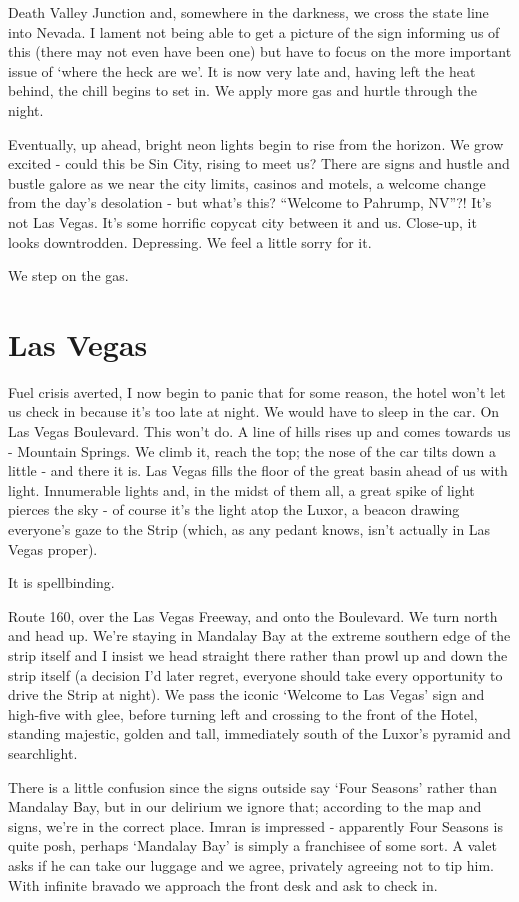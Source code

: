 \documentclass[a5paper,titlepage,11pt]{book}
\begin{document}
Death Valley Junction and, somewhere in the darkness, we cross the state line into Nevada. I lament not being able to get a picture of the sign informing us of this (there may not even have been one) but have to focus on the more important issue of `where the heck are we'. It is now very late and, having left the heat behind, the chill begins to set in. We apply more gas and hurtle through the night.

Eventually, up ahead, bright neon lights begin to rise from the horizon. We grow excited - could this be Sin City, rising to meet us?  There are signs and hustle and bustle galore as we near the city limits, casinos and motels, a welcome change from the day's desolation - but what's this?  ``Welcome to Pahrump, NV''?!  It's not Las Vegas. It's some horrific copycat city between it and us. Close-up, it looks downtrodden. Depressing. We feel a little sorry for it.

We step on the gas.

\section*{Las Vegas}
Fuel crisis averted, I now begin to panic that for some reason, the hotel won't let us check in because it's too late at night. We would have to sleep in the car. On Las Vegas Boulevard. This won't do. A line of hills rises up and comes towards us - Mountain Springs. We climb it, reach the top; the nose of the car tilts down a little - and there it is. Las Vegas fills the floor of the great basin ahead of us with light. Innumerable lights and, in the midst of them all, a great spike of light pierces the sky - of course it's the light atop the Luxor, a beacon drawing everyone's gaze to the Strip (which, as any pedant knows, isn't actually in Las Vegas proper).

It is spellbinding.

Route 160, over the Las Vegas Freeway, and onto the Boulevard. We turn north and head up. We're staying in Mandalay Bay at the extreme southern edge of the strip itself and I insist we head straight there rather than prowl up and down the strip itself (a decision I'd later regret, everyone should take every opportunity to drive the Strip at night). We pass the iconic `Welcome to Las Vegas' sign and high-five with glee, before turning left and crossing to the front of the Hotel, standing majestic, golden and tall, immediately south of the Luxor's pyramid and searchlight.

There is a little confusion since the signs outside say `Four Seasons' rather than Mandalay Bay, but in our delirium we ignore that; according to the map and signs, we're in the correct place. Imran is impressed - apparently Four Seasons is quite posh, perhaps `Mandalay Bay' is simply a franchisee of some sort. A valet asks if he can take our luggage and we agree, privately agreeing not to tip him. With infinite bravado we approach the front desk and ask to check in.
\end{document}
